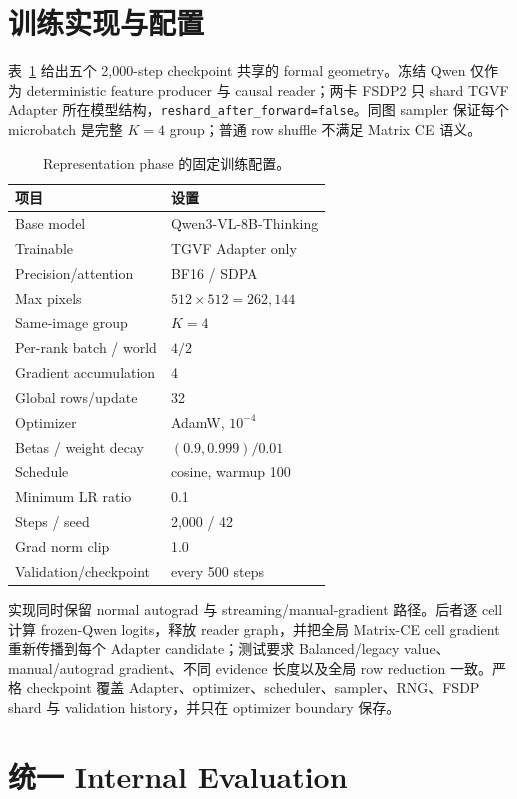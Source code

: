\documentclass[UTF8,twocolumn,10pt,a4paper]{ctexart}
\newcommand{\code}[1]{\texttt{#1}}
\begin{document}
\section{训练实现与配置}
表~\ref{tab:train} 给出五个 2,000-step checkpoint 共享的 formal geometry。冻结 Qwen 仅作为 deterministic feature producer 与 causal reader；两卡 FSDP2 只 shard TGVF Adapter 所在模型结构，\code{reshard\_after\_forward=false}。同图 sampler 保证每个 microbatch 是完整 $K=4$ group；普通 row shuffle 不满足 Matrix CE 语义。

\begin{table}[t]
\centering
\caption{Representation phase 的固定训练配置。}
\label{tab:train}
\small
\begin{tabular}{ll}
\toprule
项目 & 设置 \\
\midrule
Base model & Qwen3-VL-8B-Thinking \\
Trainable & TGVF Adapter only \\
Precision/attention & BF16 / SDPA \\
Max pixels & $512\times512=262{,}144$ \\
Same-image group & $K=4$ \\
Per-rank batch / world & $4/2$ \\
Gradient accumulation & 4 \\
Global rows/update & 32 \\
Optimizer & AdamW, $10^{-4}$ \\
Betas / weight decay & $(0.9,0.999)/0.01$ \\
Schedule & cosine, warmup 100 \\
Minimum LR ratio & 0.1 \\
Steps / seed & 2,000 / 42 \\
Grad norm clip & 1.0 \\
Validation/checkpoint & every 500 steps \\
\bottomrule
\end{tabular}
\end{table}

实现同时保留 normal autograd 与 streaming/manual-gradient 路径。后者逐 cell 计算 frozen-Qwen logits，释放 reader graph，并把全局 Matrix-CE cell gradient 重新传播到每个 Adapter candidate；测试要求 Balanced/legacy value、manual/autograd gradient、不同 evidence 长度以及全局 row reduction 一致。严格 checkpoint 覆盖 Adapter、optimizer、scheduler、sampler、RNG、FSDP shard 与 validation history，并只在 optimizer boundary 保存。

\section{统一 Internal Evaluation}
\end{document}
